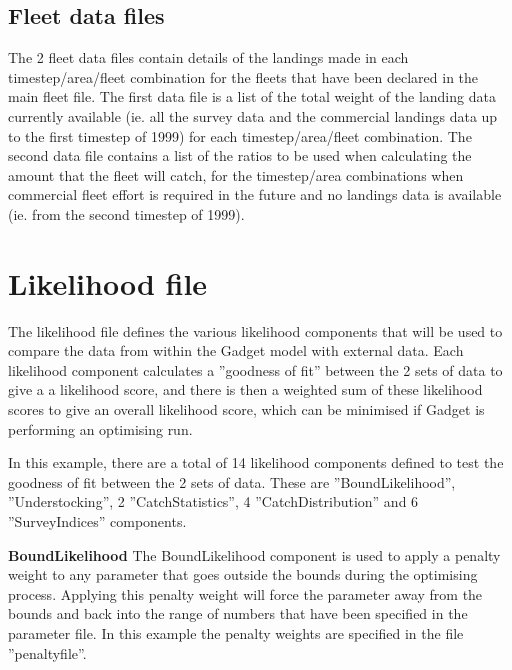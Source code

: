 \documentclass[10pt,titlepage]{article}
\begin{document}
{\small }

\subsection{Fleet data files}

The 2 fleet data files contain details of the landings made in each timestep/area/fleet combination for the fleets that have been declared in the main fleet file.  The first data file is a list of the total weight of the landing data currently available (ie. all the survey data and the commercial landings data up to the first timestep of 1999) for each timestep/area/fleet combination.  The second data file contains a list of the ratios to be used when calculating the amount that the fleet will catch, for the timestep/area combinations when commercial fleet effort is required in the future and no landings data is available (ie. from the second timestep of 1999).

{\small }
{\small }

\section{Likelihood file}

The likelihood file defines the various likelihood components that will be used to compare the data from within the Gadget model with external data.  Each likelihood component calculates a ''goodness of fit'' between the 2 sets of data to give a a likelihood score, and there is then a weighted sum of these likelihood scores to give an overall likelihood score, which can be minimised if Gadget is performing an optimising run.

\bigskip
In this example, there are a total of 14 likelihood components defined to test the goodness of fit between the 2 sets of data.  These are ''BoundLikelihood'', ''Understocking'', 2 ''CatchStatistics'', 4 ''CatchDistribution'' and 6 ''SurveyIndices'' components.

\bigskip
{\bf BoundLikelihood}\newline
The BoundLikelihood component is used to apply a penalty weight to any parameter that goes outside the bounds during the optimising process.  Applying this penalty weight will force the parameter away from the bounds and back into the range of numbers that have been specified in the parameter file.  In this example the penalty weights are specified in the file ''penaltyfile''.
\end{document}
